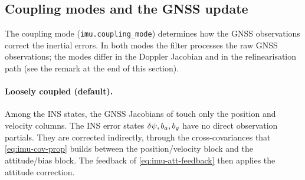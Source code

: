 \documentclass[main.tex]{subfiles}
\begin{document}
\subsection{Coupling modes and the GNSS update}\label{sec:imu-coupling}

The coupling mode (\texttt{imu.coupling\_mode}) determines how the GNSS
observations correct the inertial errors.  In both modes the filter
processes the raw GNSS observations; the modes differ in the Doppler
Jacobian and in the relinearisation path (see the remark at the end of
this section).

\paragraph{Loosely coupled (default).}
Among the INS states, the GNSS Jacobians of
 touch only the
position and velocity columns.  The INS error states
$\delta\psi,b_a,b_g$ have no direct observation partials.  They are
corrected indirectly, through the cross-covariances that
\cref{eq:imu-cov-prop} builds between the position/velocity block and the
attitude/bias block.  The feedback of \cref{eq:imu-att-feedback} then
applies the attitude correction.
\end{document}
